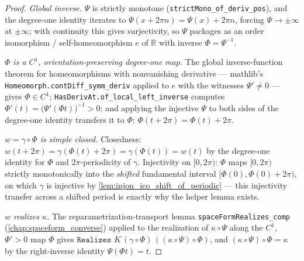 \begin{proof}
  \leanok
  \emph{Global inverse.} $\Psi$ is strictly monotone
  (\texttt{strictMono\_of\_deriv\_pos}), and the degree-one identity iterates
  to $\Psi(x+2\pi n)=\Psi(x)+2\pi n$, forcing $\Psi\to\pm\infty$ at
  $\pm\infty$; with continuity this gives surjectivity, so $\Psi$ packages as
  an order isomorphism / self-homeomorphism $e$ of $\mathbb R$ with inverse
  $\Phi=\Psi^{-1}$.

  \emph{$\Phi$ is a $C^1$, orientation-preserving degree-one map.} The global
  inverse-function theorem for homeomorphisms with nonvanishing derivative —
  mathlib's \texttt{Homeomorph.contDiff\_symm\_deriv} applied to $e$ with the
  witnesses $\Psi'\ne0$ — gives $\Phi\in C^1$;
  \texttt{HasDerivAt.of\_local\_left\_inverse} computes
  $\Phi'(t)=\bigl(\Psi'(\Phi t)\bigr)^{-1}>0$; and applying the injective
  $\Psi$ to both sides of the degree-one identity transfers it to $\Phi$:
  $\Phi(t+2\pi)=\Phi(t)+2\pi$.

  \emph{$w=\gamma\circ\Phi$ is simple closed.} Closedness: $w(t+2\pi)
  =\gamma(\Phi(t)+2\pi)=\gamma(\Phi(t))=w(t)$ by the degree-one identity for $\Phi$ and
  $2\pi$-periodicity of $\gamma$. Injectivity on $[0,2\pi)$: $\Phi$ maps
  $[0,2\pi)$ strictly monotonically into the \emph{shifted} fundamental
  interval $[\Phi(0),\Phi(0)+2\pi)$, on which $\gamma$ is injective by
  \cref{lem:injon_ico_shift_of_periodic} — this injectivity transfer across a
  shifted period is exactly why the helper lemma exists.

  \emph{$w$ realizes $\kappa$.} The reparametrization-transport lemma
  \texttt{spaceFormRealizes\_comp} (\cref{chap:spaceform_converse}) applied to
  the realization of $\kappa\circ\Psi$ along the $C^1$, $\Phi'>0$ map $\Phi$
  gives $\texttt{Realizes }K\,(\gamma\circ\Phi)\,((\kappa\circ\Psi)\circ\Phi)$,
  and $(\kappa\circ\Psi)\circ\Phi=\kappa$ by the right-inverse identity
  $\Psi(\Phi t)=t$.
\end{proof}

